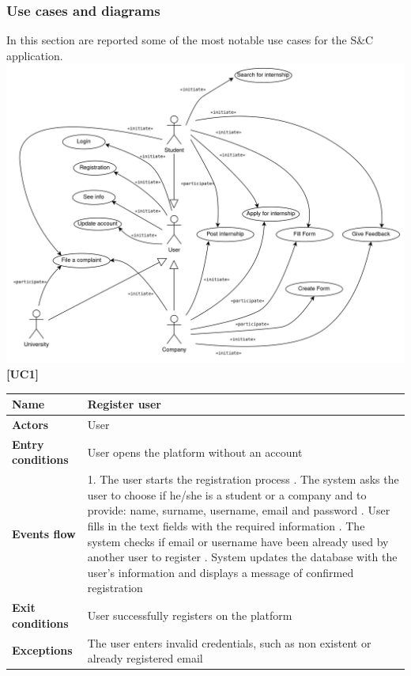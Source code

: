 \documentclass[11pt,twoside]{article}
\begin{document}
		\subsubsection{Use cases and diagrams}
In this section are reported some of the most notable use cases for the S\&C application. \\
\includegraphics[width=\textwidth]{Images/Use_case_diagram}
\newpage
\large{\textbf{[UC1]}} \\
\begin{table}[H]
\begin{tabular}{| p{} | p{} |}
\hline
\textbf{Name}
& Register user \\
\hline
\textbf{Actors}
& User \\
\hline
\textbf{Entry conditions}
& User opens the platform without an account \\
\hline
\textbf{Events flow}
& 1. The user starts the registration process \newline
2. The system asks the user to choose if he/she is a student or a company and to provide: name, surname, username, email and password \newline
3. User fills in the text fields with the required information \newline
4. The system checks if email or username have been already used by another user to register \newline
5. System updates the database with the user’s information and 
displays a message of confirmed registration  \\
\hline
\textbf{Exit conditions}
& User successfully registers on the platform \\
\hline
\textbf{Exceptions}
& The user enters invalid credentials, such as non existent or already registered email \\
\hline
\end{tabular}
\end{table}
\end{document}
